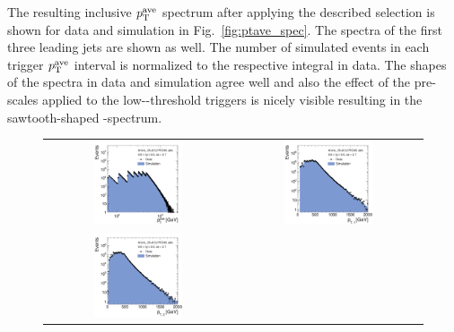 The resulting inclusive $p_{\text{T}}^\mathrm{ave}$ spectrum after applying the described selection is shown for data and simulation in Fig.~\ref{fig:ptave_spec}. The \pt spectra of the first three leading jets are shown as well. The number of simulated events in each trigger $p_{\text{T}}^\mathrm{ave}$ interval is normalized to the respective integral in data. The shapes of the spectra in data and simulation agree well and also the effect of the pre-scales applied to the low-\ptave-threshold triggers is nicely visible resulting in the sawtooth-shaped \ptave-spectrum.  
\begin{figure}[!tp]
  \centering
  \begin{tabular}{cc}
                \includegraphics[width=0.49\textwidth]{figures/PtAve__AfterAsymmHistos.pdf} &
                \includegraphics[width=0.49\textwidth]{figures/Jet1Pt__AfterAsymmHistos.pdf} \\
                \includegraphics[width=0.49\textwidth]{figures/Jet2Pt__AfterAsymmHistos.pdf} &

\end{tabular}
\end{figure}
